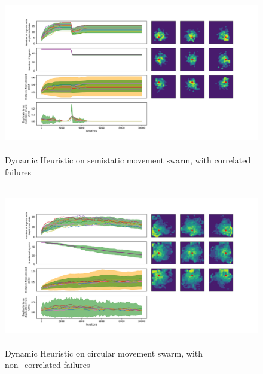 \documentclass{UoYCSproject}
\begin{document}
\begin{figure}[htb]
\label{fig:static_movement_con2}
\begin{center}
\centering
\includegraphics[height=7cm]{"./Dynamic_Heuristic/Static_move_con.png"}
\caption{Dynamic Heuristic on semi\-static movement swarm, with correlated failures}
\end{center}
\end{figure}

\begin{figure}[htb]
\label{fig:circle_movement_non2}
\begin{center}
\centering
\includegraphics[height=7cm]{"./Dynamic_Heuristic/Circle_move_non.png"}
\caption{Dynamic Heuristic on circular movement swarm, with non\_correlated failures}
\end{center}
\end{figure}
\end{document}
